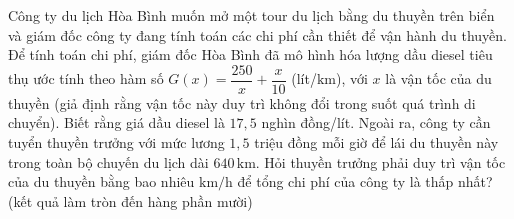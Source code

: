 \begin{ex}
Công ty du lịch Hòa Bình muốn mở một tour du lịch bằng du thuyền trên biển và giám đốc công ty đang tính toán các chi phí cần thiết để vận hành du thuyền. Để tính toán chi phí, giám đốc Hòa Bình đã mô hình hóa lượng dầu diesel tiêu thụ ước tính theo hàm số $G(x)=\dfrac{250}x+\dfrac x{10}$ (lít/$\mathrm{km}$), với $x$ là vận tốc của du thuyền (giả định rằng vận tốc này duy trì không đổi trong suốt quá trình di chuyển). Biết rằng giá dầu diesel là $17{,}5$ nghìn đồng/lít. Ngoài ra, công ty cần tuyển thuyền trưởng với mức lương $1{,}5$ triệu đồng mỗi giờ để lái du thuyền này trong toàn bộ chuyến du lịch dài $640\,\mathrm{km}$. Hỏi thuyền trưởng phải duy trì vận tốc của du thuyền bằng bao nhiêu $\mathrm{km/h}$ để tổng chi phí của công ty là thấp nhất? (kết quả làm tròn đến hàng phần mười)
\end{ex}
